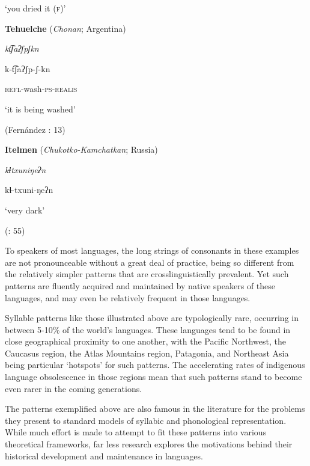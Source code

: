 ‘you dried it (\textsc{f})’



\citep[332]{Ridouane2008}

\z


\ea\label{ex:(1.4)}
   \textbf{Tehuelche} (\textit{Chonan}; Argentina)



\textit{kt͡ʃaʔʃpʃkn}



k{}-t͡ʃaʔʃp{}-ʃ{}-kn



\textsc{refl}{}-wash-\textsc{ps-realis}



‘it is being washed’



(Fernández \citealt{GarayHernández2006}: 13)

\z


\ea\label{ex:(1.5)}
   \textbf{Itelmen} (\textit{Chukotko-Kamchatkan}; Russia)



\textit{kɬtxuniŋeʔn}



kɬ{}-txuni{}-ŋeʔn



‘very dark’



(\citealt{GeorgVolodin1999}: 55)

\z


To speakers of most languages, the long strings of consonants in these examples are not pronounceable without a great deal of practice, being so different from the relatively simpler patterns that are crosslinguistically prevalent. Yet such patterns are fluently acquired and maintained by native speakers of these languages, and may even be relatively frequent in those languages.



  Syllable patterns like those illustrated above are typologically rare, occurring in between 5-10\% of the world’s languages. These languages tend to be found in close geographical proximity to one another, with the Pacific Northwest, the Caucasus region, the Atlas Mountains region, Patagonia, and Northeast Asia being particular ‘hotspots’ for such patterns. The accelerating rates of indigenous language obsolescence in those regions mean that such patterns stand to become even rarer in the coming generations.



  The patterns exemplified above are also famous in the literature for the problems they present to standard models of syllabic and phonological representation. While much effort is made to attempt to fit these patterns into various theoretical frameworks, far less research explores the motivations behind their historical development and maintenance in languages.



